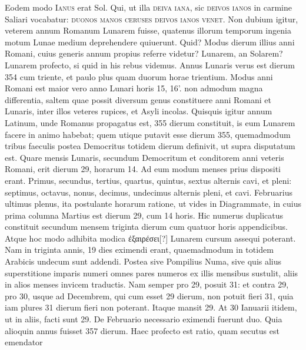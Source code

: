 Eodem
modo \textsc{Ianus} erat Sol.
%
Qui, ut illa \textsc{deiva iana}, sic \textsc{deivos
ianos} in carmine Saliari vocabatur: \textsc{duonos manos ceruses
deivos ianos venet}.
Non dubium igitur, veterem
annum Romanum Lunarem fuisse, quatenus illorum temporum ingenia
motum Lunae medium deprehendere quiuerunt.
Quid?
Modus
dierum illius anni Romani, cuius generis annum propius referre
videtur?
Lunarem, an Solarem?
Lunarem profecto, si quid in his
rebus videmus.
Annus Lunaris verus est dierum 354 cum triente,
et paulo plus quam duorum horae trientium.
Modus anni Romani
est maior vero anno Lunari horis 15, 16'. %
non admodum magna differentia,
saltem quae possit diversum genus constituere anni Romani
et Lunaris, inter illos veteres rupices, et Asyli incolas.
Quisquis igitur
annum Latinum, unde Romanus propagatus est, 355 dierum
constituit, is eum Lunarem facere in animo habebat; quem utique
putavit esse dierum 355, quemadmodum tribus faeculis postea Democritus
totidem dierum definivit, ut supra disputatum est.
Quare
mensis Lunaris, secundum Democritum et conditorem anni veteris
Romani, erit dierum 29, horarum 14.
Ad eum modum menses
prius dispositi erant.
Primus, secundus, tertius, quartus, quintus,
sextus alternis cavi, et pleni: septimus, octavus, nonus, decimus,
undecimus alternis pleni, et cavi.
Februarius ultimus plenus,
ita postulante horarum
ratione, ut vides in
Diagrammate, in cuius
prima columna Martius
est dierum 29, cum 14 horis.
Hic numerus duplicatus
constituit secundum
mensem triginta dierum
cum quatuor horis
appendicibus.
Atque hoc
modo adhibita modica
\textgreek{ἐξαιρέσει[?]} Lunarem cursum
assequi poterant.
Nam in
triginta annis, 19 dies eximendi erant, quaemadmodum in totidem
Arabicis undecum sunt addendi.
Postea sive Pompilius
Numa, sive quis alius superstitione imparis numeri omnes pares
numeros ex illis mensibus sustulit, aliis in alios menses invicem
traductis.
Nam semper pro 29, posuit 31: et contra 29,
pro 30, usque ad Decembrem, qui cum esset 29 dierum, non
potuit fieri 31, quia iam plures 31 dierum fieri non poterant.
Itaque
mansit 29.
%
At 30 Ianuarii itidem, ut in aliis, facti sunt 29.
De Februario
necessario eximendi fuerunt duo.
Quia alioquin annus fuisset
357 dierum.
Haec profecto est ratio, quam secutus est emendator
